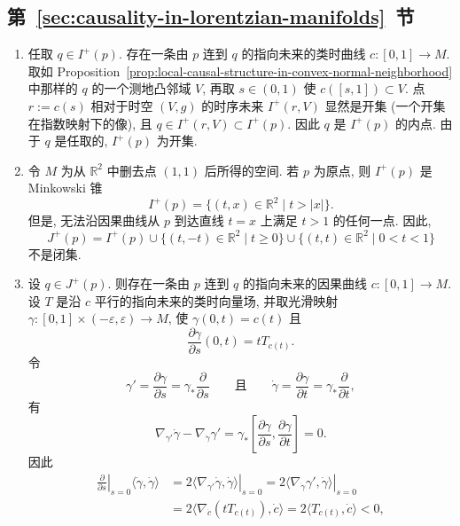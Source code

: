 \subsection{\texorpdfstring{第~\ref{sec:causality-in-lorentzian-manifolds}~节}{因果性}}\label{subsec:solutions-causality}

\begin{description}[font=\normalfont,leftmargin=2em,labelwidth=1.5em]
\begin{enumerate}[label=(\alph*),ref=\alph*,leftmargin=*]
\item 任取 $q\in I^+(p)$. 存在一条由 $p$ 连到 $q$ 的指向未来的类时曲线 $c:[0,1]\to M$. 取如 Proposition~\ref{prop:local-causal-structure-in-convex-normal-neighborhood} 中那样的 $q$ 的一个测地凸邻域 $V$, 再取 $s\in(0,1)$ 使 $c([s,1])\subset V$. 点 $r:=c(s)$ 相对于时空 $(V,g)$ 的时序未来 $I^+(r,V)$ 显然是开集 (一个开集在指数映射下的像), 且 $q\in I^+(r,V)\subset I^+(p)$. 因此 $q$ 是 $I^+(p)$ 的内点. 由于 $q$ 是任取的, $I^+(p)$ 为开集.
\item 令 $M$ 为从 $\mathbb{R}^2$ 中删去点 $(1,1)$ 后所得的空间. 若 $p$ 为原点, 则 $I^+(p)$ 是 Minkowski 锥
\[
  I^+(p)=\{(t,x)\in\mathbb{R}^2\mid t>|x|\}.
\]
但是, 无法沿因果曲线从 $p$ 到达直线 $t=x$ 上满足 $t>1$ 的任何一点. 因此,
\[
  J^+(p)=I^+(p)\cup\{(t,-t)\in\mathbb{R}^2\mid t\geq0\}
       \cup\{(t,t)\in\mathbb{R}^2\mid 0<t<1\}
\]
不是闭集.
\item 设 $q\in J^+(p)$. 则存在一条由 $p$ 连到 $q$ 的指向未来的因果曲线 $c:[0,1]\to M$. 设 $T$ 是沿 $c$ 平行的指向未来的类时向量场, 并取光滑映射 $\gamma:[0,1]\times(-\varepsilon,\varepsilon)\to M$, 使 $\gamma(0,t)=c(t)$ 且
\[
  \frac{\partial\gamma}{\partial s}(0,t)=tT_{c(t)}.
\]
令
\[
  \gamma'=\frac{\partial\gamma}{\partial s}=\gamma_*\frac{\partial}{\partial s}
  \qquad\text{且}\qquad
  \dot\gamma=\frac{\partial\gamma}{\partial t}=\gamma_*\frac{\partial}{\partial t},
\]
有
\[
  \nabla_{\gamma'}\dot\gamma-\nabla_{\dot\gamma}\gamma'
     =\gamma_*\left[\frac{\partial\gamma}{\partial s},\frac{\partial\gamma}{\partial t}\right]=0.
\]
因此
\begin{align*}
  \left.\frac{\partial}{\partial s}\right|_{s=0}\langle\dot\gamma,\dot\gamma\rangle
    &=\left.2\langle\nabla_{\gamma'}\dot\gamma,\dot\gamma\rangle\right|_{s=0}
     =\left.2\langle\nabla_{\dot\gamma}\gamma',\dot\gamma\rangle\right|_{s=0}\\
    &=2\langle\nabla_{\dot c}(tT_{c(t)}),\dot c\rangle
     =2\langle T_{c(t)},\dot c\rangle<0,

\end{align*}
\end{enumerate}
\end{description}
